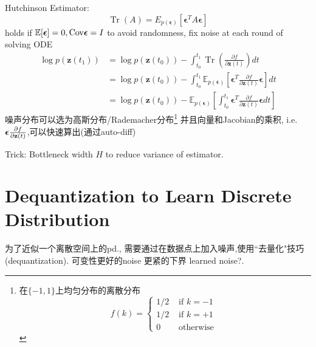 \documentclass{article}
\begin{document}
    Hutchinson Estimator:
    \begin{equation}
    \operatorname{Tr}(A)=E_{p(\boldsymbol{\epsilon})}\left[\boldsymbol{\epsilon}^{T} A \boldsymbol{\epsilon}\right]
    \end{equation}
    holds if 
    $\mathbb E[\boldsymbol{\epsilon}]=0, \text{Cov} \boldsymbol{\epsilon} = I$
    to avoid randomness, fix noise at each round of solving ODE
    \begin{equation}
        \begin{aligned}
            \log p\left(\mathbf{z}\left(t_{1}\right)\right) &=\log p\left(\mathbf{z}\left(t_{0}\right)\right)-\int_{t_{0}}^{t_{1}} \operatorname{Tr}\left(\frac{\partial f}{\partial \mathbf{z}(t)}\right) d t \\
            &=\log p\left(\mathbf{z}\left(t_{0}\right)\right)-\int_{t_{0}}^{t_{1}} \mathbb{E}_{p(\boldsymbol{\epsilon})}\left[\boldsymbol{\epsilon}^{T} \frac{\partial f}{\partial \mathbf{z}(t)} \boldsymbol{\epsilon}\right] d t \\
            &=\log p\left(\mathbf{z}\left(t_{0}\right)\right)-\mathbb{E}_{p(\boldsymbol{\epsilon})}\left[\int_{t_{0}}^{t_{1}} \boldsymbol{\epsilon}^{T} \frac{\partial f}{\partial \mathbf{z}(t)} \boldsymbol{\epsilon} d t\right]
        \end{aligned}
    \end{equation}
    噪声分布可以选为高斯分布/Rademacher分布\footnote{
        在$\{-1, 1\}$上均匀分布的离散分布
        \begin{equation}
            f(k)=\left\{\begin{array}{cl}
            1 / 2 & \text { if } k=-1 \\
            1 / 2 & \text { if } k=+1 \\
            0 & \text { otherwise }
            \end{array}\right.
        \end{equation}
    }
    并且向量和Jacobian的乘积, i.e. $\boldsymbol{\epsilon} \frac{\partial f}{\partial \mathbf{z}(t)}$,可以快速算出(通过auto-diff)

    Trick: Bottleneck width $H$ to reduce variance of estimator.


\section{Dequantization to Learn Discrete Distribution}

    为了近似一个离散空间上的pd., 需要通过在数据点上加入噪声,使用``去量化"技巧(dequantization). 可变性更好的noise \trarr 更紧的下界 \trarr learned noise?.
\end{document}
